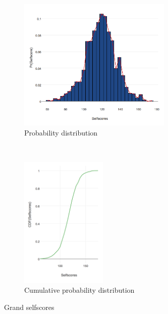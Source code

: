 \begin{figure}[htb]
   \centering
    \begin{subfigure}[t]{0.6\textwidth}
        \centering
        \includegraphics[height=2.5in]{dataset/grand/selfscores}
        \caption{Probability distribution}
    \end{subfigure}%
    ~
    \begin{subfigure}[t]{0.35\textwidth}
        \centering
        \includegraphics[height=2.5in]{dataset/grand/cdf_selfscores}
        \caption{Cumulative probability distribution}
    \end{subfigure}
    \caption{Grand selfscores}


\end{figure}
